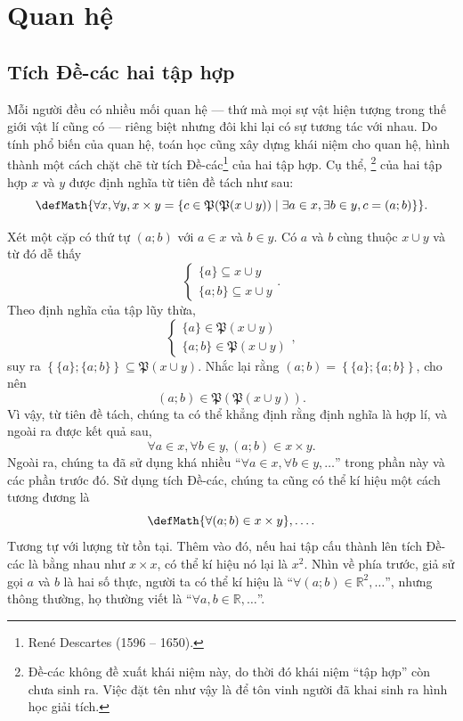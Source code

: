 \section{Quan hệ}

\subsection{Tích Đề-các hai tập hợp}

Mỗi người đều có nhiều mối quan hệ --- thứ mà mọi sự vật hiện tượng trong thế giới vật lí cũng có --- riêng biệt nhưng đôi khi lại có sự tương tác với nhau. Do tính phổ biến của quan hệ, toán học cũng xây dựng khái niệm cho quan hệ, hình thành một cách chặt chẽ từ tích Đề-các\footnote{René Descartes (1596 -- 1650).} của hai tập hợp. Cụ thể, \footnote{Đề-các không đề xuất khái niệm này, do thời đó khái niệm ``tập hợp'' còn chưa sinh ra. Việc đặt tên như vậy là để tôn vinh người đã khai sinh ra hình học giải tích.} của hai tập hợp $x$ và $y$ được định nghĩa từ tiên đề tách như sau:
\begin{equation*}
   \defMath{\forall x, \forall y, x \times y = \{c \in \mathfrak{P}(\mathfrak{P}(x \cup y)) \mid \exists a \in x, \exists b \in y, c = (a; b)\}}.
\end{equation*}

Xét một cặp có thứ tự $(a; b)$ với $a \in x$ và $b \in y$. Có $a$ và $b$ cùng thuộc $x \cup y$ và từ đó dễ thấy $$\begin{cases}
   \{a\} \subseteq x \cup y \\
   \{a; b\} \subseteq x \cup y
\end{cases}.$$ Theo định nghĩa của tập lũy thừa, \begin{equation*}
   \begin{cases}
      \{a\} \in \mathfrak{P}(x \cup y) \\
      \{a; b\} \in \mathfrak{P}(x \cup y)
   \end{cases},
\end{equation*}
suy ra $\left\{\{a\}; \{a; b\}\right\} \subseteq \mathfrak{P}(x \cup y)$. Nhắc lại rằng $(a; b) = \left\{\{a\}; \{a; b\}\right\}$, cho nên \begin{equation*}
   (a; b) \in \mathfrak{P}(\mathfrak{P}(x \cup y)).
\end{equation*}
Vì vậy, từ tiên đề tách, chúng ta có thể khẳng định rằng định nghĩa là hợp lí, và ngoài ra được kết quả sau,
\begin{equation}
   \forall a \in x, \forall b \in y, (a; b) \in x \times y.
   \label{eq:li_thuyet_tap_hop:tien_de:quan_he:dieu_kien_thuoc_tich}
\end{equation}
Ngoài ra, chúng ta đã sử dụng khá nhiều ``$\forall a \in x, \forall b \in y,\dots$'' trong phần này và các phần trước đó. Sử dụng tích Đề-các, chúng ta cũng có thể kí hiệu một cách tương đương là $$\defMath{\forall (a; b) \in x \times y},\dots.$$ Tương tự với lượng từ tồn tại. Thêm vào đó, nếu hai tập cấu thành lên tích Đề-các là bằng nhau như $x \times x$, có thể kí hiệu nó lại là $x^2$. Nhìn về phía trước, giả sử gọi $a$ và $b$ là hai số thực, người ta có thể kí hiệu là ``$\forall (a; b) \in \mathbb{R}^2, \dots$'', nhưng thông thường, họ thường viết là ``$\forall a, b \in \mathbb{R},\dots$''.

